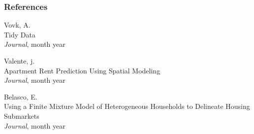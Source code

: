 \documentclass{beamer}
\begin{document}
\begin{frame}
\frametitle{References}
\footnotesize{
	\begin{thebibliography}{99} %
		
		 Vovk, A. \\
		\newblock Tidy Data\\
		\newblock \emph{Journal}, month year
		
		 Valente, j. \\
		\newblock Apartment Rent Prediction Using Spatial Modeling\\
		\newblock \emph{Journal}, month year
		
		 Belasco, E. \\
		\newblock Using a Finite Mixture Model of Heterogeneous Households to Delineate Housing Submarkets\\
		\newblock \emph{Journal}, month year
		
	\end{thebibliography}
}
\end{frame}
    
\end{document}

